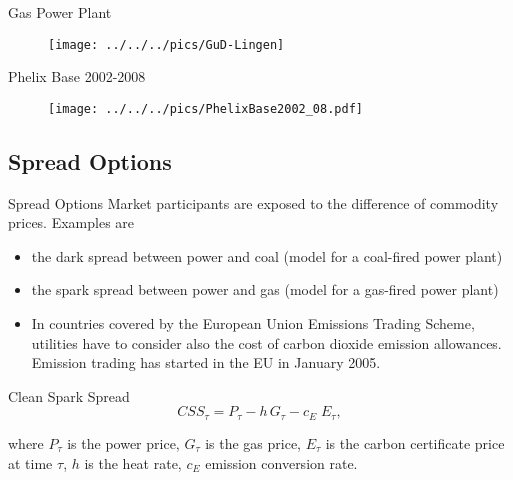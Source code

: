 {Gas Power Plant}
\begin{figure}[htp]
\centering
\texttt{[image: ../../../pics/GuD-Lingen]}
\label{prices}
\end{figure}



{Phelix Base 2002-2008}
\begin{figure}[htp]
\centering
\texttt{[image: ../../../pics/PhelixBase2002\_08.pdf]}

\end{figure}




\subsection{Spread Options}

{Spread Options}
Market participants are exposed to the difference of
commodity prices. Examples are
\begin{itemize}
  \item the dark spread between power and coal (model for a coal-fired power plant)
  \item the spark spread between power and gas (model for a gas-fired power plant)
  \item In countries covered by the European Union Emissions Trading Scheme, utilities have to consider also the cost of carbon dioxide emission allowances. Emission trading has started in the EU in January 2005.

\end{itemize}



{Clean Spark Spread}
\begin{equation}
CSS_\tau= P_\tau - h\,G_\tau- c_E\;E_\tau,
\label{clean_spark_spread}
\end{equation}

where $P_\tau$ is the power price, $G_\tau$ is the gas price, $E_\tau$ is the carbon certificate price at time $\tau$, $h$ is the heat rate, $c_E$ emission conversion rate.

